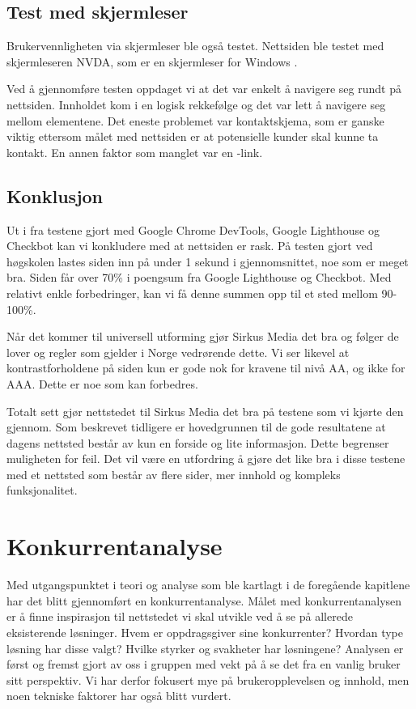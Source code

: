 \subsection{Test med skjermleser}
Brukervennligheten via skjermleser ble også testet. Nettsiden ble testet med skjermleseren NVDA, som er en skjermleser for Windows \cite{nvda}. 

Ved å gjennomføre testen oppdaget vi at det var enkelt å navigere seg rundt på nettsiden. Innholdet kom i en logisk rekkefølge og det var lett å navigere seg mellom elementene. Det eneste problemet var kontaktskjema, som er ganske viktig ettersom målet med nettsiden er at potensielle kunder skal kunne ta kontakt. En annen faktor som manglet var en -link.

\subsection{Konklusjon}
\label{sec:analysis-original-website}
Ut i fra testene gjort med Google Chrome DevTools, Google Lighthouse og Checkbot kan vi konkludere med at nettsiden er rask. På testen gjort ved høgskolen lastes siden inn på under 1 sekund i gjennomsnittet, noe som er meget bra. Siden får over 70\% i poengsum fra Google Lighthouse og Checkbot. Med relativt enkle forbedringer, kan vi få denne summen opp til et sted mellom 90-100\%.

Når det kommer til universell utforming gjør Sirkus Media det bra og følger de lover og regler som gjelder i Norge vedrørende dette. Vi ser likevel at kontrastforholdene på siden kun er gode nok for kravene til nivå AA, og ikke for AAA. Dette er noe som kan forbedres.

Totalt sett gjør nettstedet til Sirkus Media det bra på testene som vi kjørte den gjennom. Som beskrevet tidligere er hovedgrunnen til de gode resultatene at dagens nettsted består av kun en forside og lite informasjon. Dette begrenser muligheten for feil. Det vil være en utfordring å gjøre det like bra i disse testene med et nettsted som består av flere sider, mer innhold og kompleks funksjonalitet.

\section{Konkurrentanalyse}
\label{sec:competitor-analysis}

Med utgangspunktet i teori og analyse som ble kartlagt i de foregående kapitlene har det blitt gjennomført en konkurrentanalyse. Målet med konkurrentanalysen er å finne inspirasjon til nettstedet vi skal utvikle ved å se på allerede eksisterende løsninger. Hvem er oppdragsgiver sine konkurrenter? Hvordan type løsning har disse valgt? Hvilke styrker og svakheter har løsningene? Analysen er først og fremst gjort av oss i gruppen med vekt på å se det fra en vanlig bruker sitt perspektiv. Vi har derfor fokusert mye på brukeropplevelsen og innhold, men noen tekniske faktorer har også blitt vurdert.

